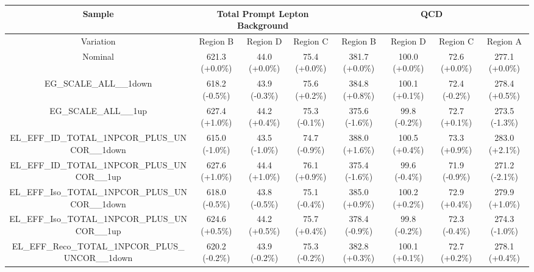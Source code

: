 %
%
\begin{table}[htbp!]
\begin{tiny}
\begin{center}
\begin{tabular}{c|c|c|c||c|c|c|c}
Sample                                                          &\multicolumn{3}{c||}{Total Prompt Lepton Background}      &\multicolumn{4}{c}{QCD}                                                  \\
\hline  
Variation                                                       & Region B       & Region D         & Region C           & Region B        & Region D         & Region C          & Region A         \\ 
\hline  
Nominal                                                      & 621.3     (+0.0\%) & 44.0      (+0.0\%) & 75.4      (+0.0\%) & 381.7     (+0.0\%) & 100.0     (+0.0\%) & 72.6      (+0.0\%) & 277.1     (+0.0\%) \\ 
\hline
EG\_SCALE\_ALL\_\_1down                                      & 618.2     (-0.5\%) & 43.9      (-0.3\%) & 75.6      (+0.2\%) & 384.8     (+0.8\%) & 100.1     (+0.1\%) & 72.4      (-0.2\%) & 278.4     (+0.5\%) \\ 
EG\_SCALE\_ALL\_\_1up                                        & 627.4     (+1.0\%) & 44.2      (+0.4\%) & 75.3      (-0.1\%) & 375.6     (-1.6\%) & 99.8      (-0.2\%) & 72.7      (+0.1\%) & 273.5     (-1.3\%) \\ 
EL\_EFF\_ID\_TOTAL\_1NPCOR\_PLUS\_UNCOR\_\_1down             & 615.0     (-1.0\%) & 43.5      (-1.0\%) & 74.7      (-0.9\%) & 388.0     (+1.6\%) & 100.5     (+0.4\%) & 73.3      (+0.9\%) & 283.0     (+2.1\%) \\ 
EL\_EFF\_ID\_TOTAL\_1NPCOR\_PLUS\_UNCOR\_\_1up               & 627.6     (+1.0\%) & 44.4      (+1.0\%) & 76.1      (+0.9\%) & 375.4     (-1.6\%) & 99.6      (-0.4\%) & 71.9      (-0.9\%) & 271.2     (-2.1\%) \\ 
EL\_EFF\_Iso\_TOTAL\_1NPCOR\_PLUS\_UNCOR\_\_1down            & 618.0     (-0.5\%) & 43.8      (-0.5\%) & 75.1      (-0.4\%) & 385.0     (+0.9\%) & 100.2     (+0.2\%) & 72.9      (+0.4\%) & 279.9     (+1.0\%) \\ 
EL\_EFF\_Iso\_TOTAL\_1NPCOR\_PLUS\_UNCOR\_\_1up              & 624.6     (+0.5\%) & 44.2      (+0.5\%) & 75.7      (+0.4\%) & 378.4     (-0.9\%) & 99.8      (-0.2\%) & 72.3      (-0.4\%) & 274.3     (-1.0\%) \\ 
EL\_EFF\_Reco\_TOTAL\_1NPCOR\_PLUS\_UNCOR\_\_1down           & 620.2     (-0.2\%) & 43.9      (-0.2\%) & 75.3      (-0.2\%) & 382.8     (+0.3\%) & 100.1     (+0.1\%) & 72.7      (+0.2\%) & 278.1     (+0.4\%) \\ 

\end{tabular}
\end{center}
\end{tiny}
\end{table}
